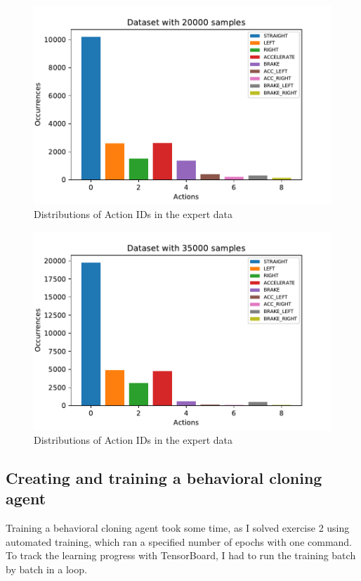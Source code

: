\documentclass[
        a4paper,
        10pt,
        parskip = full,    %
    ]{scrartcl}
\begin{document}
\begin{figure}[H]
  \begin{center}
    \includegraphics{../images/action_distribution_20000.pdf}
    \caption{Distributions of Action IDs in the expert data}
    \label{dist_20000}
  \end{center}
\end{figure}

\begin{figure}[H]
  \begin{center}
    \includegraphics{../images/action_distribution_35000.pdf}
    \caption{Distributions of Action IDs in the expert data}
    \label{dist_10000}
  \end{center}
\end{figure}


\subsection{Creating and training a behavioral cloning agent}
Training a behavioral cloning agent took some time, as I solved exercise 2 using automated training, which ran a specified number of epochs with one command. To track the learning progress with TensorBoard, I had to run the training batch by batch in a loop.
\end{document}
